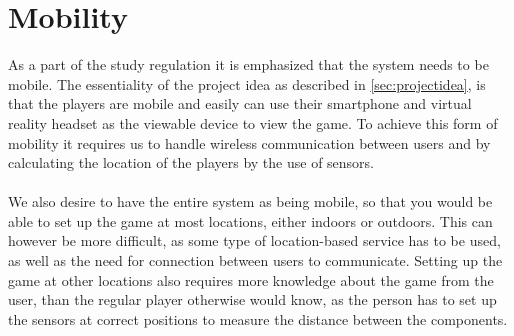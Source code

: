 \section{Mobility}\label{sec:mobility}
As a part of the study regulation it is emphasized that the system needs to be mobile.
The essentiality of the project idea as described in \autoref{sec:projectidea}, is that the players are mobile and easily can use their smartphone and virtual reality headset as the viewable device to view the game.
To achieve this form of mobility it requires us to handle wireless communication between users and by calculating the location of the players by the use of sensors.
\\\\
We also desire to have the entire system as being mobile, so that you would be able to set up the game at most locations, either indoors or outdoors.
This can however be more difficult, as some type of location-based service has to be used, as well as the need for connection between users to communicate.
Setting up the game at other locations also requires more knowledge about the game from the user, than the regular player otherwise would know, as the person has to set up the sensors at correct positions to measure the distance between the components.